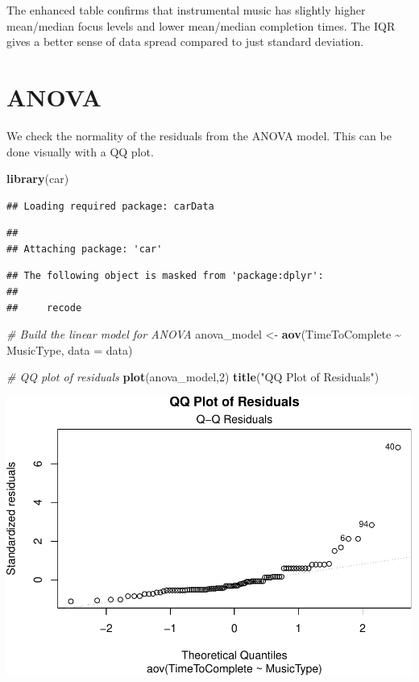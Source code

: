 \documentclass[
]{article}
\newenvironment{Shaded}{\begin{snugshade}}{\end{snugshade}}
\newcommand{\AttributeTok}[1]{\textcolor[rgb]{0.13,0.29,0.53}{#1}}
\newcommand{\CommentTok}[1]{\textcolor[rgb]{0.56,0.35,0.01}{\textit{#1}}}
\newcommand{\DecValTok}[1]{\textcolor[rgb]{0.00,0.00,0.81}{#1}}
\newcommand{\FunctionTok}[1]{\textcolor[rgb]{0.13,0.29,0.53}{\textbf{#1}}}
\newcommand{\NormalTok}[1]{#1}
\newcommand{\OtherTok}[1]{\textcolor[rgb]{0.56,0.35,0.01}{#1}}
\newcommand{\SpecialCharTok}[1]{\textcolor[rgb]{0.81,0.36,0.00}{\textbf{#1}}}
\newcommand{\StringTok}[1]{\textcolor[rgb]{0.31,0.60,0.02}{#1}}
\begin{document}
The enhanced table confirms that instrumental music has slightly higher
mean/median focus levels and lower mean/median completion times. The IQR
gives a better sense of data spread compared to just standard deviation.

\section{ANOVA}\label{anova}

We check the normality of the residuals from the ANOVA model. This can
be done visually with a QQ plot.

\begin{Shaded}
\begin{Highlighting}[]
\FunctionTok{library}\NormalTok{(car)    }
\end{Highlighting}
\end{Shaded}

\begin{verbatim}
## Loading required package: carData
\end{verbatim}

\begin{verbatim}
## 
## Attaching package: 'car'
\end{verbatim}

\begin{verbatim}
## The following object is masked from 'package:dplyr':
## 
##     recode
\end{verbatim}

\begin{Shaded}
\begin{Highlighting}[]
\CommentTok{\# Build the linear model for ANOVA}
\NormalTok{anova\_model }\OtherTok{\textless{}{-}} \FunctionTok{aov}\NormalTok{(TimeToComplete }\SpecialCharTok{\textasciitilde{}}\NormalTok{ MusicType, }\AttributeTok{data =}\NormalTok{ data)}

\CommentTok{\# QQ plot of residuals}
\FunctionTok{plot}\NormalTok{(anova\_model,}\DecValTok{2}\NormalTok{) }
\FunctionTok{title}\NormalTok{(}\StringTok{"QQ Plot of Residuals"}\NormalTok{)}
\end{Highlighting}
\end{Shaded}

\includegraphics{Assignment2_files/figure-latex/unnamed-chunk-6-1.pdf}
\end{document}
